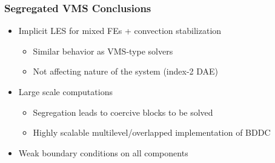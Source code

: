 \begin{frame}
\frametitle{Segregated VMS Conclusions}
\vfill
\begin{itemize}
\item Implicit LES for mixed FEs + convection stabilization
\begin{itemize}
\item Similar behavior as VMS-type solvers
\item Not affecting nature of the system (index-2 DAE)
\end{itemize}
\item Large scale computations
\begin{itemize}
\item Segregation leads to coercive blocks to be solved
\item Highly scalable multilevel/overlapped implementation of BDDC
\end{itemize}
\item Weak boundary conditions on all components
\end{itemize}
\vfill
\end{frame}